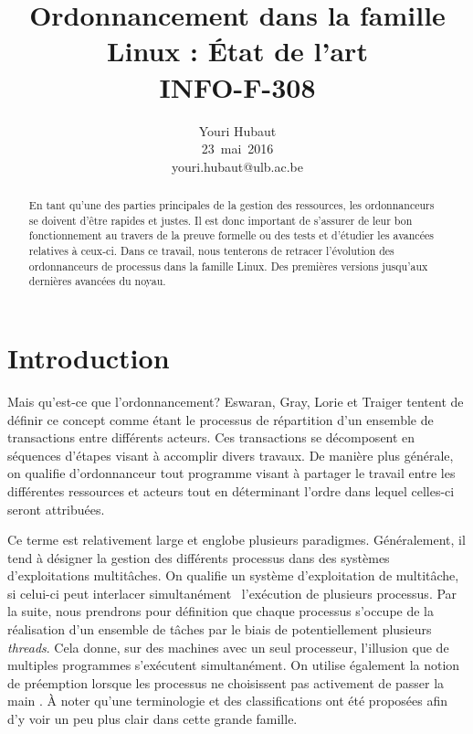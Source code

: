\documentclass[letterpaper]{article}
\title{Ordonnancement dans la famille Linux : État de l'art \\
INFO-F-308}
\author{Youri Hubaut \\
\mbox{23 mai 2016}\\
youri.hubaut@ulb.ac.be}
\begin{document}
\pagestyle{fancy}
\fancyhf{}
\renewcommand{\headrulewidth}{0pt}
\cfoot{\thepage}

\maketitle

\begin{abstract}

En tant qu'une des parties principales de la gestion des ressources, les ordonnanceurs se doivent d'être rapides et justes. Il est donc important de s'assurer de leur bon fonctionnement au travers de la preuve formelle ou des tests et d'étudier les avancées relatives à ceux-ci. Dans ce travail, nous tenterons de retracer l'évolution des ordonnanceurs de processus dans la famille Linux. Des premières versions jusqu'aux dernières avancées du noyau.

\end{abstract}

\section{Introduction}

Mais qu'est-ce que l'ordonnancement? Eswaran, Gray, Lorie et Traiger \citep{Eswaran:1976:NPC:360363.360369} tentent de définir ce concept comme étant le processus de répartition d'un ensemble de transactions entre différents acteurs. Ces transactions se décomposent en séquences d'étapes visant à accomplir divers travaux. De manière plus générale, on qualifie d'ordonnanceur tout programme visant à partager le travail entre les différentes ressources et acteurs tout en déterminant l'ordre dans lequel celles-ci seront attribuées.

Ce terme est relativement large et englobe plusieurs paradigmes. Généralement, il tend à désigner la gestion des différents processus dans des systèmes d'exploitations multitâches. On qualifie un système d'exploitation de multitâche, si celui-ci peut interlacer \og simultanément \fg ~l'exécution de plusieurs processus. Par la suite, nous prendrons pour définition que chaque processus s'occupe de la réalisation d'un ensemble de tâches par le biais de potentiellement plusieurs \textit{threads}. Cela donne, sur des machines avec un seul processeur, l'illusion que de multiples programmes s'exécutent simultanément. On utilise également la notion de préemption lorsque les processus ne choisissent pas activement de passer la main \citep{Bach:1986:DUO:8570}. À noter qu'une terminologie \citep{Casavant:1988:TSG:630789.630963} et des classifications \citep{DBLP:journals/tc/WangM85} ont été proposées afin d'y voir un peu plus clair dans cette grande famille.
\end{document}
